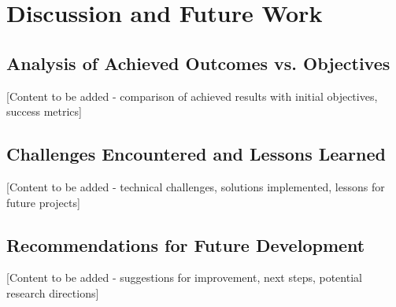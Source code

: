 \vspace{21.5pt}
\chapter{Discussion and Future Work}

\section{Analysis of Achieved Outcomes vs. Objectives}

[Content to be added - comparison of achieved results with initial objectives, success metrics]

\section{Challenges Encountered and Lessons Learned}

[Content to be added - technical challenges, solutions implemented, lessons for future projects]

\section{Recommendations for Future Development}

[Content to be added - suggestions for improvement, next steps, potential research directions]
